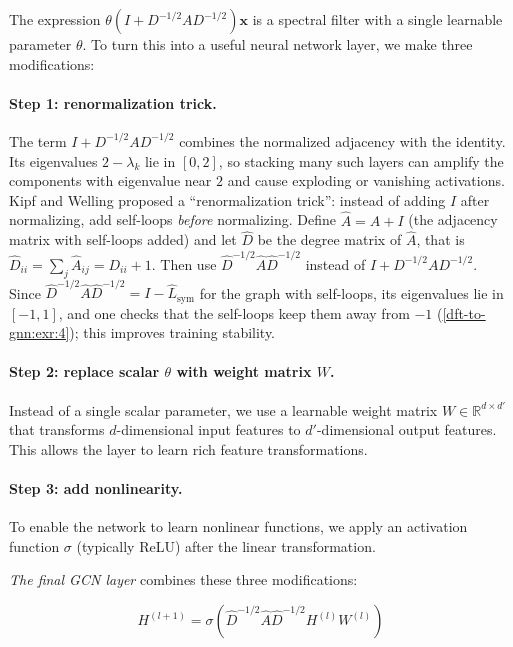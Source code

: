 \begin{notechapter}
The expression $\theta(I + D^{-1/2} A D^{-1/2})\mathbf{x}$ is a spectral
filter with a single learnable parameter $\theta$. To turn this into a
useful neural network layer, we make three modifications:

\paragraph{Step 1: renormalization trick.} The term $I + D^{-1/2} A D^{-1/2}$
combines the normalized adjacency with the identity. Its eigenvalues $2 - \lambda_k$ lie in $[0, 2]$, so stacking many such layers can amplify the components with eigenvalue near $2$ and cause exploding or vanishing activations. Kipf and Welling proposed a ``renormalization trick'': instead
of adding $I$ after normalizing, add self-loops \emph{before} normalizing.
Define $\hat{A} = A + I$ (the adjacency matrix with self-loops added) and let $\hat{D}$ be the degree matrix of $\hat{A}$, that is
$\hat{D}_{ii} = \sum_j \hat{A}_{ij} = D_{ii} + 1$.
Then use $\hat{D}^{-1/2} \hat{A} \hat{D}^{-1/2}$ instead of
$I + D^{-1/2} A D^{-1/2}$. Since $\hat D^{-1/2}\hat A\hat D^{-1/2} = I - \hat L_{\text{sym}}$ for the graph with self-loops, its eigenvalues lie in $[-1, 1]$, and one checks that the self-loops keep them away from $-1$ (\cref{dft-to-gnn:exr:4}); this improves training stability.

\paragraph{Step 2: replace scalar $\theta$ with weight matrix $W$.}
Instead of a single scalar parameter, we use a learnable weight matrix
$W \in \mathbb{R}^{d \times d'}$ that transforms $d$-dimensional input
features to $d'$-dimensional output features. This allows the layer to
learn rich feature transformations.

\paragraph{Step 3: add nonlinearity.} To enable the network to learn
nonlinear functions, we apply an activation function $\sigma$ (typically
ReLU) after the linear transformation.

\emph{The final GCN layer} combines these three modifications:

\begin{equation}
H^{(l+1)} = \sigma\left( \hat{D}^{-1/2} \hat{A} \hat{D}^{-1/2}
             H^{(l)} W^{(l)} \right)
\end{equation}


\end{notechapter}
